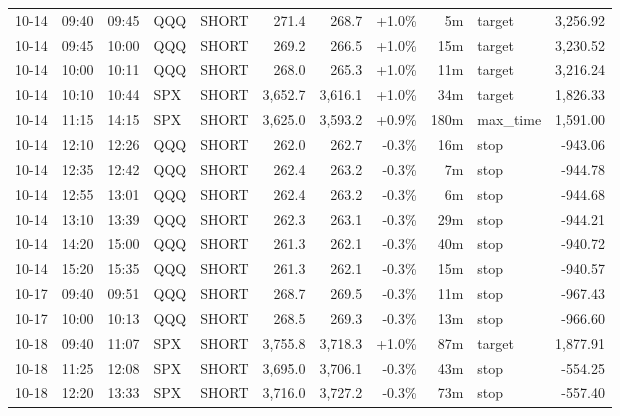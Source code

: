 \documentclass[11pt,a4paper,twoside]{article}
\begin{document}
\begin{center}
\begin{longtable}{>{\color{txtmain}}l l l l l r r r r >{\color{txtmain}}l r}
10-14 & 09:40 & 09:45 & QQQ & SHORT & 271.4 & 268.7 & \textcolor{wingreen}{+1.0\%} & 5m & target & \textcolor{wingreen}{3,256.92} \\
10-14 & 09:45 & 10:00 & QQQ & SHORT & 269.2 & 266.5 & \textcolor{wingreen}{+1.0\%} & 15m & target & \textcolor{wingreen}{3,230.52} \\
10-14 & 10:00 & 10:11 & QQQ & SHORT & 268.0 & 265.3 & \textcolor{wingreen}{+1.0\%} & 11m & target & \textcolor{wingreen}{3,216.24} \\
10-14 & 10:10 & 10:44 & SPX & SHORT & 3,652.7 & 3,616.1 & \textcolor{wingreen}{+1.0\%} & 34m & target & \textcolor{wingreen}{1,826.33} \\
10-14 & 11:15 & 14:15 & SPX & SHORT & 3,625.0 & 3,593.2 & \textcolor{wingreen}{+0.9\%} & 180m & max\_time & \textcolor{wingreen}{1,591.00} \\
10-14 & 12:10 & 12:26 & QQQ & SHORT & 262.0 & 262.7 & \textcolor{lossred}{-0.3\%} & 16m & stop & \textcolor{lossred}{-943.06} \\
10-14 & 12:35 & 12:42 & QQQ & SHORT & 262.4 & 263.2 & \textcolor{lossred}{-0.3\%} & 7m & stop & \textcolor{lossred}{-944.78} \\
10-14 & 12:55 & 13:01 & QQQ & SHORT & 262.4 & 263.2 & \textcolor{lossred}{-0.3\%} & 6m & stop & \textcolor{lossred}{-944.68} \\
10-14 & 13:10 & 13:39 & QQQ & SHORT & 262.3 & 263.1 & \textcolor{lossred}{-0.3\%} & 29m & stop & \textcolor{lossred}{-944.21} \\
10-14 & 14:20 & 15:00 & QQQ & SHORT & 261.3 & 262.1 & \textcolor{lossred}{-0.3\%} & 40m & stop & \textcolor{lossred}{-940.72} \\
10-14 & 15:20 & 15:35 & QQQ & SHORT & 261.3 & 262.1 & \textcolor{lossred}{-0.3\%} & 15m & stop & \textcolor{lossred}{-940.57} \\
10-17 & 09:40 & 09:51 & QQQ & SHORT & 268.7 & 269.5 & \textcolor{lossred}{-0.3\%} & 11m & stop & \textcolor{lossred}{-967.43} \\
10-17 & 10:00 & 10:13 & QQQ & SHORT & 268.5 & 269.3 & \textcolor{lossred}{-0.3\%} & 13m & stop & \textcolor{lossred}{-966.60} \\
10-18 & 09:40 & 11:07 & SPX & SHORT & 3,755.8 & 3,718.3 & \textcolor{wingreen}{+1.0\%} & 87m & target & \textcolor{wingreen}{1,877.91} \\
10-18 & 11:25 & 12:08 & SPX & SHORT & 3,695.0 & 3,706.1 & \textcolor{lossred}{-0.3\%} & 43m & stop & \textcolor{lossred}{-554.25} \\
10-18 & 12:20 & 13:33 & SPX & SHORT & 3,716.0 & 3,727.2 & \textcolor{lossred}{-0.3\%} & 73m & stop & \textcolor{lossred}{-557.40} \\

\end{longtable}
\end{center}
\end{document}
